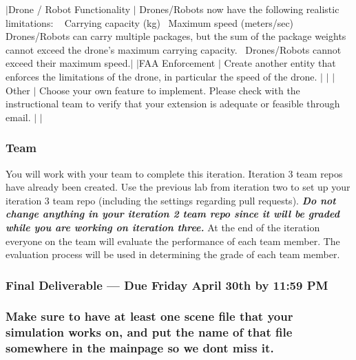 $\vert$\+Drone / Robot Functionality $\vert$ Drones/\+Robots now have the following realistic limitations\+: ~\newline
Carrying capacity (kg)~\newline
Maximum speed (meters/sec)~\newline
Drones/\+Robots can carry multiple packages, but the sum of the package weights cannot exceed the drone’s maximum carrying capacity.~\newline
Drones/\+Robots cannot exceed their maximum speed.$\vert$ $\vert$\+F\+AA Enforcement $\vert$ Create another entity that enforces the limitations of the drone, in particular the speed of the drone. $\vert$ $\vert$ $\vert$\+Other $\vert$ Choose your own feature to implement. Please check with the instructional team to verify that your extension is adequate or feasible through email. $\vert$ $\vert$

\subsubsection*{Team}

You will work with your team to complete this iteration. Iteration 3 team repos have already been created. Use the previous lab from iteration two to set up your iteration 3 team repo (including the settings regarding pull requests). {\itshape {\bfseries Do not change anything in your iteration 2 team repo since it will be graded while you are working on iteration three.}} At the end of the iteration everyone on the team will evaluate the performance of each team member. The evaluation process will be used in determining the grade of each team member.

\subsubsection*{Final Deliverable --- Due Friday April 30th by 11\+:59 PM}

\subsubsection*{Make sure to have at least one scene file that your simulation works on, and put the name of that file somewhere in the mainpage so we don\textquotesingle{}t miss it.}


